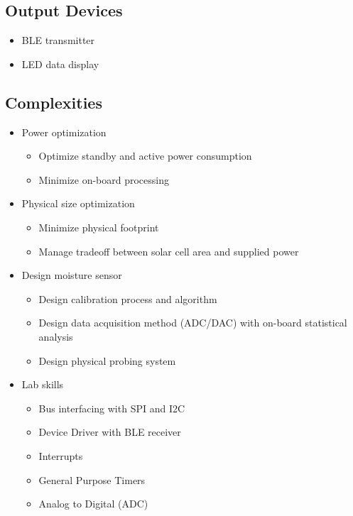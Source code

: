 \documentclass{article}
\begin{document}
\subsection{Output Devices}
\begin{itemize}
    \item BLE transmitter
    \item LED data display
\end{itemize}

\subsection{Complexities}
\begin{itemize}
    \item Power optimization
        \begin{itemize}
            \item Optimize standby and active power consumption
            \item Minimize on-board processing
        \end{itemize}
    \item Physical size optimization
        \begin{itemize}
            \item Minimize physical footprint
            \item Manage tradeoff between solar cell area and supplied power
        \end{itemize}
    \item Design moisture sensor
        \begin{itemize}
            \item Design calibration process and algorithm
            \item Design data acquisition method (ADC/DAC) with on-board
                statistical analysis
            \item Design physical probing system
        \end{itemize}
    \item Lab skills
        \begin{itemize}
            \item Bus interfacing with SPI and I2C
            \item Device Driver with BLE receiver
            \item Interrupts
            \item General Purpose Timers
            \item Analog to Digital (ADC)
        \end{itemize}
\end{itemize}
\end{document}
